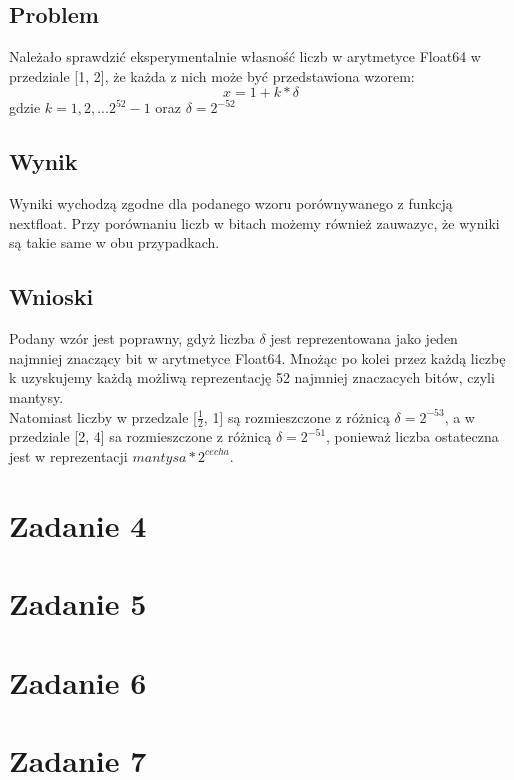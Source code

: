 \documentclass[11pt, a4paper]{article}
\begin{document}
\subsection{Problem}
Należało sprawdzić eksperymentalnie własność liczb w arytmetyce Float64 w przedziale [1, 2], że każda z nich może być przedstawiona wzorem:
\[x =1 + k * \delta \] gdzie $k = 1, 2, ... 2^{52}-1$ oraz $\delta = 2^{-52}$
\subsection{Wynik}
Wyniki wychodzą zgodne dla podanego wzoru porównywanego z funkcją nextfloat. Przy porównaniu liczb w bitach możemy również zauwazyc, że wyniki są takie same w obu przypadkach.
\subsection{Wnioski}
Podany wzór jest poprawny, gdyż liczba $\delta$ jest reprezentowana jako jeden najmniej znaczący bit w arytmetyce Float64. Mnożąc po kolei przez każdą liczbę k uzyskujemy każdą możliwą reprezentację 52 najmniej znaczacych bitów, czyli mantysy.
\\
Natomiast liczby w przedzale [$\frac{1}{2}$, 1] są rozmieszczone z różnicą $\delta = 2^{-53}$, a w przedziale [2, 4] sa rozmieszczone z różnicą $\delta = 2^{-51}$, ponieważ liczba ostateczna jest w reprezentacji $mantysa*2^{cecha}$. 


\section{Zadanie 4}

\section{Zadanie 5}

\section{Zadanie 6}

\section{Zadanie 7}
\end{document}

